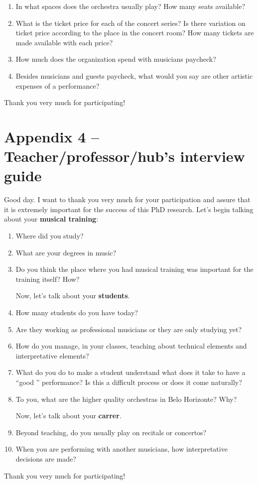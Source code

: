 \documentclass[a4paper, 12pt, openright, oneside, german, french, brazil, english]{abntex2}
\begin{document}
\begin{enumerate}
          \vspace{0.8cm}
          [\textbf{If it is an orchestra:}]
        \item In what spaces does the orchestra usually play? How many seats available?
        \item What is the ticket price for each of the concert series? Is there variation on ticket price according to the place in the concert room? How many tickets are made available with each price?
        \item How much does the organization spend with musicians paycheck?
        \item Besides musicians and guests paycheck, what would you say are other artistic expenses of a performance?

        \end{enumerate}

        Thank you very much for participating!
        


        \newpage

        \section*{Appendix 4 -- Teacher/professor/hub's interview guide}

        Good day. I want to thank you very much for your participation and assure that it is extremely important for the success of this PhD research. Let's begin talking about your \textbf{musical training}:

        \begin{enumerate}
        \item Where did you study?
        \item What are your degrees in music?
        \item Do you think the place where you had musical training was important for the training itself? How?

          \vspace{1cm}
        Now, let's talk about your \textbf{students}.
        \item How many students do you have today?
        \item Are they working as professional musicians or they are only studying yet?
        \item How do you manage, in your classes, teaching about technical elements and interpretative elements?
        \item What do you do to make a student understand what does it take to have a ``good '' performance? Is this a difficult process or does it come naturally?
        \item To you, what are the higher quality orchestras in Belo Horizonte? Why?

          \vspace{1cm}
          Now, let's talk about your \textbf{carrer}.
        \item Beyond teaching, do you usually play on recitals or concertos?
        \item When you are performing with another musicians, how interpretative decisions are made?
        \end{enumerate}

        Thank you very much for participating!

       
\end{document}
